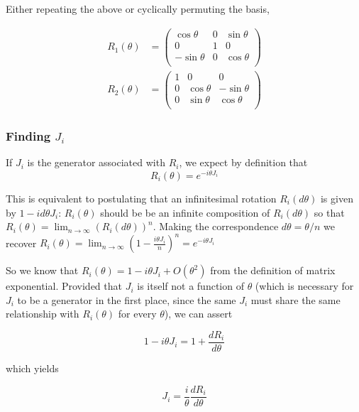 \documentclass[12pt]{article}
\begin{document}
Either repeating the above or cyclically permuting the basis,

\begin{align*}
R_1(\theta)&=\left(
\begin{array}{ccc}
 \cos \theta & 0 & \sin \theta  \\
 0 & 1 & 0 \\
 -\sin \theta  & 0 & \cos \theta  \\
\end{array}
\right)\\[8pt]
R_2(\theta)&=\left(
\begin{array}{ccc}
 1 & 0 & 0 \\
 0 & \cos \theta & -\sin \theta  \\
 0 & \sin \theta  & \cos \theta  \\
\end{array}
\right)
\end{align*}


\subsubsection*{Finding \(J_i\)}

If \(J_i\) is the generator associated with \(R_i\), we expect by definition that 
\[R_i(\theta) = e^{-i\theta J_i}
\]

This is equivalent to postulating that an infinitesimal rotation \(R_i(d\theta)\) is given by \( 1-id\theta J_i\): \(R_i(\theta)\) should be be an infinite composition of \(R_i(d\theta)\) so that \(R_i(\theta) =   \lim_{n\to\infty} \left(R_i(d\theta)\right)^n\). Making the correspondence \(d\theta = \theta/n\) we recover \(R_i(\theta) =  \lim_{n\to\infty} \left( 1 - \frac{i\theta J_i}{n}\right)^n  = e^{-i\theta J_i}\)

So we know that \(R_i(\theta) = 1 - i\theta J_i + O(\theta^2)\) from the definition of matrix exponential. Provided that \(J_i\) is itself not a function of \(\theta\) (which is necessary for \(J_i\) to be a generator in the first place, since the same \(J_i\) must share the same relationship with \(R_i(\theta)\) for every \(\theta\)), we can assert

\[1 - i\theta J_i = 1 + \frac{dR_i}{d\theta}
\]

which yields

\[ J_i = \frac{i}{\theta}\frac{dR_i}{d\theta}
\]
\end{document}
